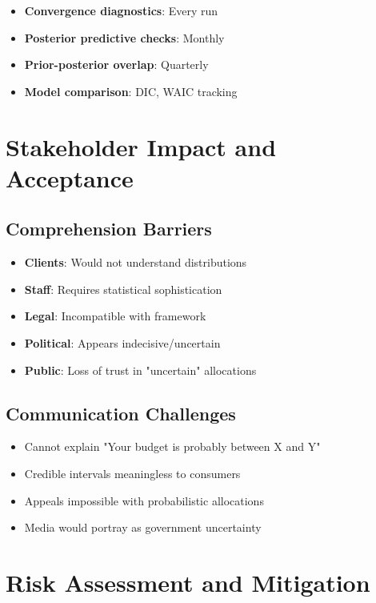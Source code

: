 \begin{itemize}
    \item \textbf{Convergence diagnostics}: Every run
    \item \textbf{Posterior predictive checks}: Monthly
    \item \textbf{Prior-posterior overlap}: Quarterly
    \item \textbf{Model comparison}: DIC, WAIC tracking
\end{itemize}

\section{Stakeholder Impact and Acceptance}

\subsection{Comprehension Barriers}

\begin{itemize}
    \item \textbf{Clients}: Would not understand distributions
    \item \textbf{Staff}: Requires statistical sophistication
    \item \textbf{Legal}: Incompatible with framework
    \item \textbf{Political}: Appears indecisive/uncertain
    \item \textbf{Public}: Loss of trust in "uncertain" allocations
\end{itemize}

\subsection{Communication Challenges}

\begin{itemize}
    \item Cannot explain "Your budget is probably between X and Y"
    \item Credible intervals meaningless to consumers
    \item Appeals impossible with probabilistic allocations
    \item Media would portray as government uncertainty
\end{itemize}

\section{Risk Assessment and Mitigation}

